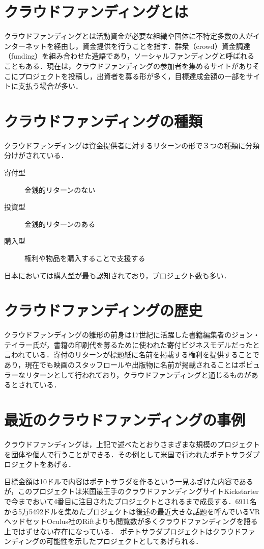 \section{クラウドファンディングとは}
クラウドファンディングとは活動資金が必要な組織や団体に不特定多数の人がインターネットを経由し，資金提供を行うことを指す．群衆（crowd）資金調達（funding）を組み合わせた造語であり，ソーシャルファンディングと呼ばれることもある．現在は，クラウドファンディングの参加者を集めるサイトがありそこにプロジェクトを投稿し，出資者を募る形が多く，目標達成金額の一部をサイトに支払う場合が多い．

\section{クラウドファンディングの種類}
クラウドファンディングは資金提供者に対するリターンの形で３つの種類に分類分けがされている．
\begin{description}
 \item[寄付型] 金銭的リターンのない
 \item[投資型] 金銭的リターンのある
 \item[購入型] 権利や物品を購入することで支援する
\end{description}
日本においては購入型が最も認知されており，プロジェクト数も多い．

\section{クラウドファンディングの歴史}
クラウドファンディングの雛形の前身は17世紀に活躍した書籍編集者のジョン・テイラー氏が，書籍の印刷代を募るために使われた寄付ビジネスモデルだったと言われている．寄付のリターンが標題紙に名前を掲載する権利を提供することであり，現在でも映画のスタッフロールや出版物に名前が掲載されることはポピュラーなリターンとして行われており，クラウドファンディングと通じるものがあるとされている．

\section{最近のクラウドファンディングの事例}
クラウドファンディングは，上記で述べたとおりさまざまな規模のプロジェクトを団体や個人で行うことができる．その例として米国で行われたポテトサラダプロジェクトをあげる．

目標金額は10ドルで内容はポテトサラダを作るという一見ふざけた内容であるが，このプロジェクトは米国最王手のクラウドファンディングサイトKickstarterで今までおいて4番目に注目されたプロジェクトとされるまで成長する．6911名から5万5492ドルを集めたプロジェクトは後述の最近大きな話題を呼んでいるVRヘッドセットOculus社のRiftよりも閲覧数が多くクラウドファンディングを語る上ではずせない存在になっている．
ポテトサラダプロジェクトはクラウドファンディングの可能性を示したプロジェクトとしてあげられる．

